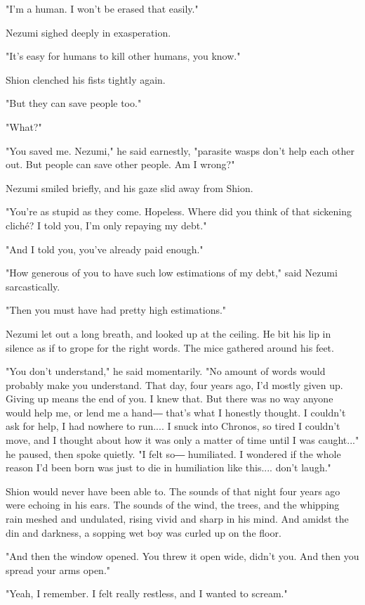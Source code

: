 "I'm a human. I won't be erased that easily."

Nezumi sighed deeply in exasperation.

"It's easy for humans to kill other humans, you know."

Shion clenched his fists tightly again.

"But they can save people too."

"What?"

"You saved me. Nezumi," he said earnestly, "parasite wasps don't help
each other out. But people can save other people. Am I wrong?"

Nezumi smiled briefly, and his gaze slid away from Shion.

"You're as stupid as they come. Hopeless. Where did you think of that
sickening cliché? I told you, I'm only repaying my debt."

"And I told you, you've already paid enough."

"How generous of you to have such low estimations of my debt," said
Nezumi sarcastically.

"Then you must have had pretty high estimations."

Nezumi let out a long breath, and looked up at the ceiling. He bit his
lip in silence as if to grope for the right words. The mice gathered
around his feet.

"You don't understand," he said momentarily. "No amount of words would
probably make you understand. That day, four years ago, I'd mostly given
up. Giving up means the end of you. I knew that. But there was no way
anyone would help me, or lend me a hand― that's what I honestly thought.
I couldn't ask for help, I had nowhere to run.... I snuck into Chronos,
so tired I couldn't move, and I thought about how it was only a matter
of time until I was caught..." he paused, then spoke quietly. "I felt
so― humiliated. I wondered if the whole reason I'd been born was just to
die in humiliation like this.... don't laugh."

Shion would never have been able to. The sounds of that night four years
ago were echoing in his ears. The sounds of the wind, the trees, and the
whipping rain meshed and undulated, rising vivid and sharp in his mind.
And amidst the din and darkness, a sopping wet boy was curled up on the
floor.

"And then the window opened. You threw it open wide, didn't you. And
then you spread your arms open."

"Yeah, I remember. I felt really restless, and I wanted to scream."

